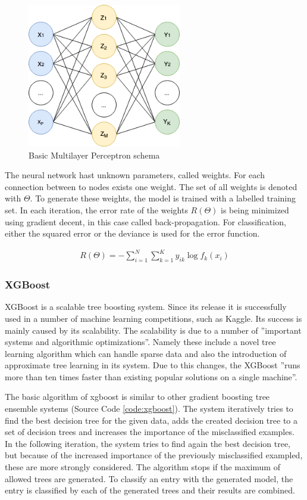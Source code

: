 \begin{figure}[h]
    \centering
    \includegraphics[width=0.6\textwidth]{images/nn_struct.png}
    \caption{Basic Multilayer Perceptron schema}
    \label{fig:mlp-struc}
\end{figure}

The neural network hast unknown parameters, called weights. For each connection between to nodes exists one weight. The set of all weights is denoted with $\Theta$. To generate these weights, the model is trained with a labelled training set. In each iteration, the error rate of the weights $R(\Theta)$ is being minimized using gradient decent, in this case called back-propagation. For classification, either the squared error or the deviance is used for the error function. \cite{hastie2005elements}

\begin{align}
    R(\Theta)=-\sum_{i=1}^N\sum_{k=1}^K y_{ik} \log f_k(x_i)
\end{align}{}


\subsubsection{XGBoost}
XGBoost is a scalable tree boosting system. Since its release it is successfully used in a number of machine learning competitions, such as Kaggle. Its success is mainly caused by its scalability. The scalability is due to a number of ''important systems and algorithmic optimizations''. Namely these include a novel tree learning algorithm which can handle sparse data and also the introduction of approximate tree learning in its system. Due to this changes, the XGBoost ''runs more than ten times faster than existing popular solutions on a single machine''.  \cite{chen2016xgboost}

The basic algorithm of xgboost is similar to other gradient boosting tree ensemble systems (Source Code \ref{code:xgboost}). The system iteratively tries to find the best decision tree for the given data, adds the created decision tree to a set of decision trees and increases the importance of the misclassified examples. In the following iteration, the system tries to find again the best decision tree, but because of the increased importance of the previously misclassified exampled, these are more strongly considered. The algorithm stops if the maximum of allowed trees are generated. To classify an entry with the generated model, the entry is classified by each of the generated trees and their results are combined. \cite{chen2016xgboost}

